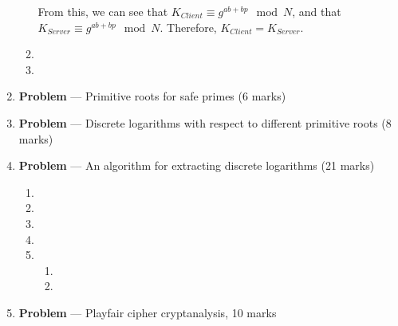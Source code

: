 \documentclass[11pt]{article}
\theoremstyle{definition}
\newcounter{problem}
\begin{document}
\begin{enumerate}
\begin{enumerate}
From this, we can see that $K_{Client} \equiv g^{ab + bp} \mod{N}$, and that $K_{Server} \equiv g^{ab + bp} \mod{N}$. Therefore, $K_{Client} = K_{Server}$.

\item 

\item
\end{enumerate}


\newpage

\item[] \textbf{Problem \theproblem} --- Primitive roots for safe primes (6 marks)

\newpage

\item[] \textbf{Problem \theproblem} --- Discrete logarithms with respect to different primitive
    roots (8 marks)

\newpage

\item[] \textbf{Problem \theproblem} --- An algorithm for extracting discrete logarithms (21
    marks)

\begin{enumerate}
\item

\item

\item

\item

\item
    \begin{enumerate}
    \item

    \item
\end{enumerate}
\end{enumerate}

\newpage

 

\item[] \textbf{Problem \theproblem} --- Playfair cipher cryptanalysis, 10 marks

\end{enumerate}
\end{document}
